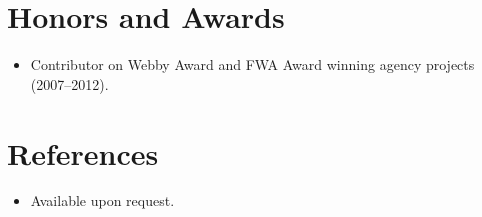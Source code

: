 \documentclass[11pt,a4paper,sans]{moderncv}
\begin{document}
\section{Honors and Awards}
\vspace{1pt}
\begin{itemize}
\item{Contributor on Webby Award and FWA Award winning agency projects (2007--2012).}
\end{itemize}


\section{References}
\vspace{1pt}
\begin{itemize}
\item{Available upon request.}
\end{itemize}
\end{document}
